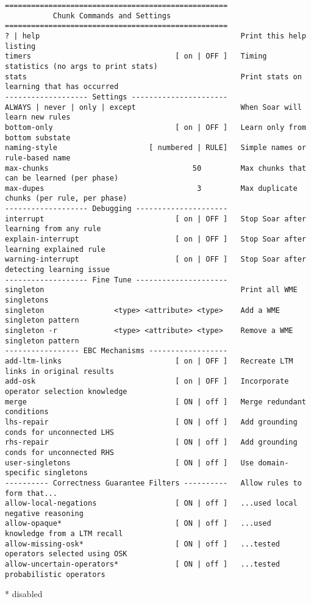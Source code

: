 {\footnotesize
\begin{verbatim}
===================================================
           Chunk Commands and Settings
===================================================
? | help                                              Print this help listing
timers                                 [ on | OFF ]   Timing statistics (no args to print stats)
stats                                                 Print stats on learning that has occurred
------------------- Settings ----------------------
ALWAYS | never | only | except                        When Soar will learn new rules
bottom-only                            [ on | OFF ]   Learn only from bottom substate
naming-style                     [ numbered | RULE]   Simple names or rule-based name
max-chunks                                 50         Max chunks that can be learned (per phase)
max-dupes                                   3         Max duplicate chunks (per rule, per phase)
------------------- Debugging ---------------------
interrupt                              [ on | OFF ]   Stop Soar after learning from any rule
explain-interrupt                      [ on | OFF ]   Stop Soar after learning explained rule
warning-interrupt                      [ on | OFF ]   Stop Soar after detecting learning issue
------------------- Fine Tune ---------------------
singleton                                             Print all WME singletons
singleton                <type> <attribute> <type>    Add a WME singleton pattern
singleton -r             <type> <attribute> <type>    Remove a WME singleton pattern
----------------- EBC Mechanisms ------------------
add-ltm-links                          [ on | OFF ]   Recreate LTM links in original results
add-osk                                [ on | OFF ]   Incorporate operator selection knowledge
merge                                  [ ON | off ]   Merge redundant conditions
lhs-repair                             [ ON | off ]   Add grounding conds for unconnected LHS
rhs-repair                             [ ON | off ]   Add grounding conds for unconnected RHS
user-singletons                        [ ON | off ]   Use domain-specific singletons
---------- Correctness Guarantee Filters ----------   Allow rules to form that...
allow-local-negations                  [ ON | off ]   ...used local negative reasoning
allow-opaque*                          [ ON | off ]   ...used knowledge from a LTM recall
allow-missing-osk*                     [ ON | off ]   ...tested operators selected using OSK
allow-uncertain-operators*             [ ON | off ]   ...tested probabilistic operators
\end{verbatim}
* disabled
}

